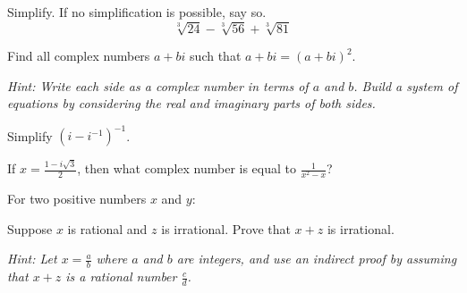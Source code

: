 \documentclass[12pt]{exam}
\begin{document}
\begin{questions}
\question[10]
Simplify. If no simplification is possible, say so.
$$\sqrt[3]{24} - \sqrt[3]{56} + \sqrt[3]{81}$$
\vspace*{4cm}

\newpage

\question[12]
Find all complex numbers $a + bi$ such that $a + bi = (a + bi)^2$.

\textit{Hint: Write each side as a complex number in terms of $a$ and $b$. Build a system of equations by considering the real and imaginary parts of both sides.}
\vspace*{6cm}

\question[8]
Simplify $(i - i^{-1})^{-1}$.
\vspace*{4cm}

\question[10]
If $x = \frac{1 - i\sqrt{3}}{2}$, then what complex number is equal to $\frac{1}{x^2 - x}$?
\vspace*{5cm}

\newpage

\question[12]
For two positive numbers $x$ and $y$:

\question[10]
Suppose $x$ is rational and $z$ is irrational. Prove that $x + z$ is irrational.

\textit{Hint: Let $x = \frac{a}{b}$ where $a$ and $b$ are integers, and use an indirect proof by assuming that $x + z$ is a rational number $\frac{c}{d}$.}
\vspace*{5cm}

\end{questions}
\end{document}

